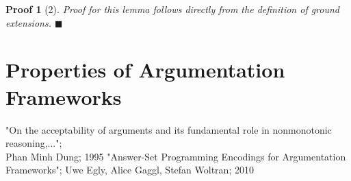 \documentclass[12pt]{report}
\numberwithin{figure}{chapter}
\theoremstyle{break}
\newtheorem*{prf}{Proof}
\newenvironment{myprf}{\begin{prf}}{$\blacksquare$ \end{prf}}
\begin{document}
\begin{myprf}[2]
Proof for this lemma follows directly from the definition of ground extensions.
\end{myprf}

\newpage

\section{Properties of Argumentation Frameworks}













\begin{thebibliography}{1}
	 "On the acceptability of arguments and its fundamental role in nonmonotonic reasoning,...";\\Phan Minh Dung; 1995
	 "Answer-Set Programming Encodings for Argumentation Frameworks"; Uwe Egly, Alice Gaggl, Stefan Woltran; 2010  
\end{thebibliography}
\end{document}
